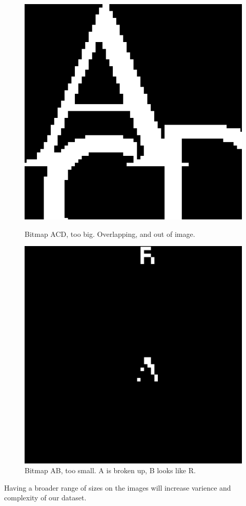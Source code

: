 \begin{figure}[!htb]
      \includegraphics[width=\linewidth]{figures/Bitmap-big-ACD}
      \caption{Bitmap ACD, too big. Overlapping, and out of image.}
      \label{Bitmap-big-ACD}
    \endminipage\hfill
      \includegraphics[width=\linewidth]{figures/Bitmap-small-AB}
      \caption{Bitmap AB, too small. A is broken up, B looks like R.} 
      \label{Bitmap-small-AB}
    \endminipage
\end{figure}

Having a broader range of sizes on the images will increase varience and complexity of our dataset.

